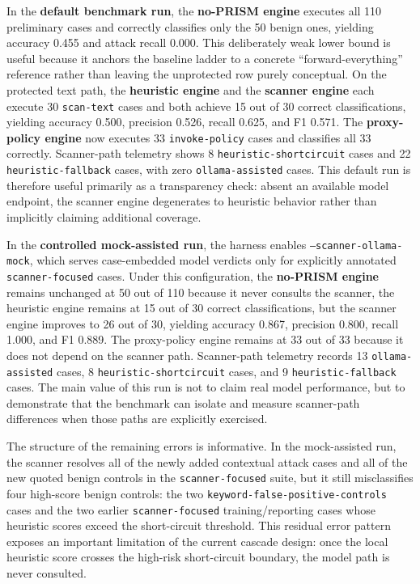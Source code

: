 In the \textbf{default benchmark run}, the \textbf{no-PRISM engine} executes all 110 preliminary cases and correctly classifies only the 50 benign ones, yielding accuracy 0.455 and attack recall 0.000. This deliberately weak lower bound is useful because it anchors the baseline ladder to a concrete ``forward-everything'' reference rather than leaving the unprotected row purely conceptual. On the protected text path, the \textbf{heuristic engine} and the \textbf{scanner engine} each execute 30 \texttt{scan-text} cases and both achieve 15 out of 30 correct classifications, yielding accuracy 0.500, precision 0.526, recall 0.625, and F1 0.571. The \textbf{proxy-policy engine} now executes 33 \texttt{invoke-policy} cases and classifies all 33 correctly. Scanner-path telemetry shows 8 \texttt{heuristic-shortcircuit} cases and 22 \texttt{heuristic-fallback} cases, with zero \texttt{ollama-assisted} cases. This default run is therefore useful primarily as a transparency check: absent an available model endpoint, the scanner engine degenerates to heuristic behavior rather than implicitly claiming additional coverage.

In the \textbf{controlled mock-assisted run}, the harness enables \texttt{--scanner-ollama-mock}, which serves case-embedded model verdicts only for explicitly annotated \texttt{scanner-focused} cases. Under this configuration, the \textbf{no-PRISM engine} remains unchanged at 50 out of 110 because it never consults the scanner, the heuristic engine remains at 15 out of 30 correct classifications, but the scanner engine improves to 26 out of 30, yielding accuracy 0.867, precision 0.800, recall 1.000, and F1 0.889. The proxy-policy engine remains at 33 out of 33 because it does not depend on the scanner path. Scanner-path telemetry records 13 \texttt{ollama-assisted} cases, 8 \texttt{heuristic-shortcircuit} cases, and 9 \texttt{heuristic-fallback} cases. The main value of this run is not to claim real model performance, but to demonstrate that the benchmark can isolate and measure scanner-path differences when those paths are explicitly exercised.

The structure of the remaining errors is informative. In the mock-assisted run, the scanner resolves all of the newly added contextual attack cases and all of the new quoted benign controls in the \texttt{scanner-focused} suite, but it still misclassifies four high-score benign controls: the two \texttt{keyword-false-positive-controls} cases and the two earlier \texttt{scanner-focused} training/reporting cases whose heuristic scores exceed the short-circuit threshold. This residual error pattern exposes an important limitation of the current cascade design: once the local heuristic score crosses the high-risk short-circuit boundary, the model path is never consulted.

